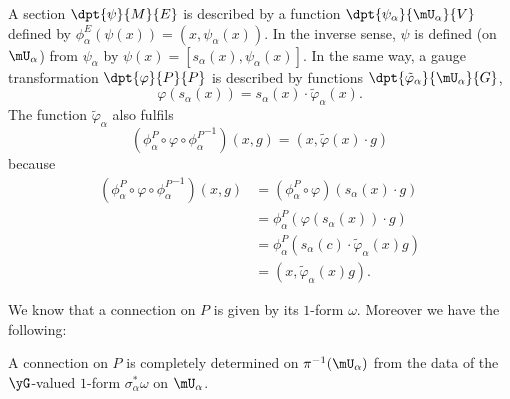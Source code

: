 A section $\dpt{\psi}{M}{E}$ is described by a function $\dpt{\psi_{\alpha}}{\mU_{\alpha}}{V}$ defined by $\phi^E_{\alpha}(\psi(x))=(x,\psi_{\alpha}(x))$.  In the inverse sense, $\psi$ is defined (on $\mU_{\alpha}$) from $\psi_{\alpha}$ by
$\psi(x)=[s_{\alpha}(x),\psi_{\alpha}(x)]$.
In the same way, a gauge transformation $\dpt{\varphi}{P}{P}$ is described by functions $\dpt{\tilde{\varphi}_{\alpha}}{\mU_{\alpha}}{G}$,
\begin{equation}
  \varphi(s_{\alpha}(x))=s_{\alpha}(x)\cdot\tilde{\varphi}_{\alpha}(x).
\end{equation}
The function $\tilde{\varphi}_{\alpha}$ also fulfils
\begin{equation}
  (\phi_{\alpha}^P\circ\varphi\circ{\phi_{\alpha}^P}^{-1})(x,g)=(x,\tilde{\varphi}(x)\cdot g) 
\end{equation}
because
\begin{equation}
\begin{split}
  (\phi_{\alpha}^P\circ\varphi\circ{\phi_{\alpha}^P}^{-1})(x,g)&=(\phi_{\alpha}^P\circ\varphi)(s_{\alpha}(x)\cdot g)\\
                                                      &=\phi_{\alpha}^P( \varphi(s_{\alpha}(x))\cdot g )\\
                                                      &=\phi_{\alpha}^P( s_{\alpha}(c)\cdot\tilde{\varphi}_{\alpha}(x)g)\\
                                                      &=(x,\tilde{\varphi}_{\alpha}(x)g).
\end{split}
\end{equation}

We know that a connection on $P$ is given by its $1$-form $\omega$. Moreover we have the following:
\begin{proposition}
A connection on $P$ is completely determined on $\pi^{-1}(\mU_{\alpha})$ from the data of the $\yG$-valued $1$-form $\sigma_{\alpha}^*\omega$ on $\mU_{\alpha}$.
\end{proposition}

